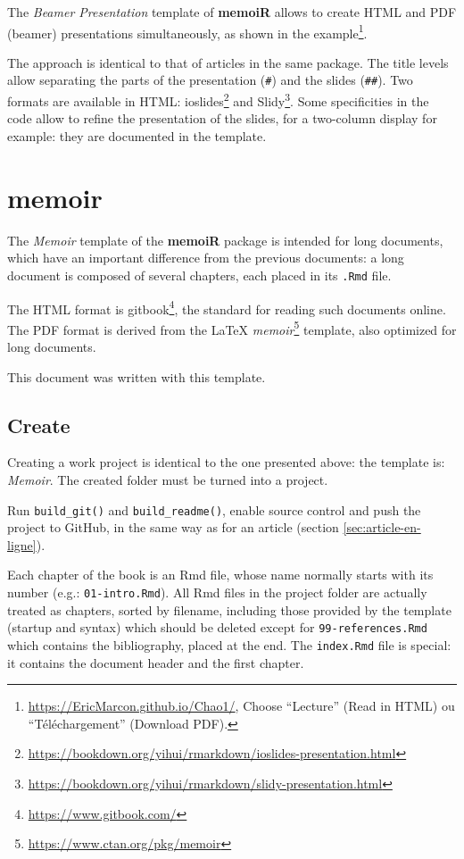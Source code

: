 \documentclass[
  12pt,
  american,
  a4paper,
  extrafontsizes,onecolumn,openright
  ]{memoir}
\begin{document}
The \emph{Beamer Presentation} template of \textbf{memoiR} allows to create HTML and PDF (beamer) presentations simultaneously, as shown in the example\footnote{\url{https://EricMarcon.github.io/Chao1/}, Choose \enquote{Lecture} (Read in HTML) ou \enquote{Téléchargement} (Download PDF).}.

The approach is identical to that of articles in the same package.
The title levels allow separating the parts of the presentation (\texttt{\#}) and the slides (\texttt{\#\#}).
Two formats are available in HTML: ioslides\footnote{\url{https://bookdown.org/yihui/rmarkdown/ioslides-presentation.html}} and Slidy\footnote{\url{https://bookdown.org/yihui/rmarkdown/slidy-presentation.html}}.
Some specificities in the code allow to refine the presentation of the slides, for a two-column display for example: they are documented in the template.

\hypertarget{memoir}{%
\section{memoir}\label{memoir}}

The \emph{Memoir} template of the \textbf{memoiR} package is intended for long documents, which have an important difference from the previous documents: a long document is composed of several chapters, each placed in its \texttt{.Rmd} file.

The HTML format is gitbook\footnote{\url{https://www.gitbook.com/}}, the standard for reading such documents online.
The PDF format is derived from the LaTeX \emph{memoir}\footnote{\url{https://www.ctan.org/pkg/memoir}} template, also optimized for long documents.

This document was written with this template.

\hypertarget{create-1}{%
\subsection{Create}\label{create-1}}

Creating a work project is identical to the one presented above: the template is: \emph{Memoir}.
The created folder must be turned into a project.

Run \texttt{build\_git()} and \texttt{build\_readme()}, enable source control and push the project to GitHub, in the same way as for an article (section \ref{sec:article-en-ligne}).

Each chapter of the book is an Rmd file, whose name normally starts with its number (e.g.: \texttt{01-intro.Rmd}).
All Rmd files in the project folder are actually treated as chapters, sorted by filename, including those provided by the template (startup and syntax) which should be deleted except for \texttt{99-references.Rmd} which contains the bibliography, placed at the end.
The \texttt{index.Rmd} file is special: it contains the document header and the first chapter.
\end{document}
